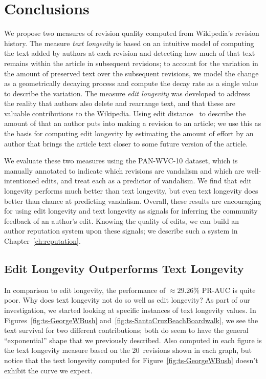 \section{Conclusions}

We propose two measures of revision quality computed
from Wikipedia's revision history.
The measure \textit{text longevity} is based on an intuitive
model of computing the text added by authors at each revision
and detecting how much of that text remains within the article
in subsequent revisions; to account for the variation in
the amount of preserved text over the subsequent revisions,
we model the change as a geometrically decaying process
and compute the decay rate as a single value to describe
the variation.
The measure \textit{edit longevity} was developed to address
the reality that authors also delete and rearrange text,
and that these are valuable contributions to the Wikipedia.
Using edit distance~\cite{Levenshtein1966} to describe the
amount of  that an author puts into making a
revision to an article; we use this as the basis for computing
edit longevity by estimating the amount of effort by an
author that brings the article text closer to some future
version of the article.

We evaluate these two measures using the PAN-WVC-10 dataset, which is
manually annotated to indicate which revisions are vandalism and which
are well-intentioned edits, and treat each as a predictor of vandalism.
We find that edit longevity performs much better than text longevity,
but even text longevity does better than chance at predicting vandalism.
Overall, these results are encouraging for using edit longevity and text
longevity as signals for inferring the community feedback of an author's
edit.  Knowing the quality of edits, we can build an author reputation
system upon these signals; we describe such a system in
Chapter~\ref{ch:reputation}.

\subsection{Edit Longevity Outperforms Text Longevity}

In comparison to edit longevity, the performance of ${\approx}29.26\%$
PR-AUC is quite poor.
Why does text longevity not do so well as edit longevity?
As part of our investigation, we started looking at specific
instances of text longevity values.
In Figures~\ref{fig:ts-GeorgeWBush} and~\ref{fig:ts-SantaCruzBeachBoardwalk},
we see the text survival for two different contributions;
both do seem to have the general ``exponential'' shape
that we previously described.
Also computed in each figure is the text longevity measure based on
the 20~revisions shown in each graph, but notice that the text
longevity computed for
Figure~\ref{fig:ts-GeorgeWBush} doesn't exhibit the curve we expect.

